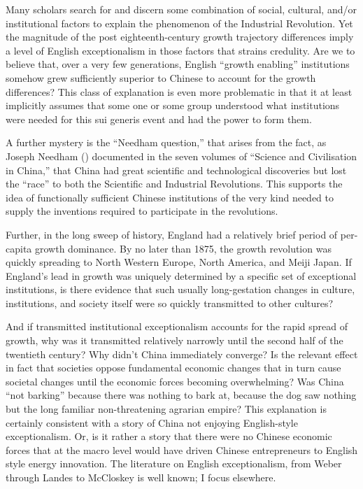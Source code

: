 \documentclass[12pt]{article}
\numberwithin{equation}{section}
\begin{document}
	Many scholars search for and discern some combination of social, cultural, and/or institutional factors to explain the phenomenon of the Industrial Revolution. Yet the magnitude of the post eighteenth-century growth trajectory differences imply a level of English exceptionalism in those factors that strains credulity. Are we to believe that, over a very few generations, English ``growth enabling'' institutions somehow grew sufficiently superior to Chinese to account for the growth differences? This class of explanation is even more problematic in that it at least implicitly assumes that some one or some group understood what institutions were needed for this sui generis event and had the power to form them.
	
	A further mystery is the ``Needham question,'' that arises from the fact, as Joseph Needham (\citeyear{needham_science_1954}) documented in the seven volumes of ``Science and Civilisation in China,'' that China had great scientific and technological discoveries but lost the ``race'' to both the Scientific and Industrial Revolutions. This supports the idea of functionally sufficient Chinese institutions of the very kind needed to supply the inventions required to participate in the revolutions.
	
	Further, in the long sweep of history, England had a relatively brief period of per-capita growth dominance. By no later than 1875, the growth revolution was quickly spreading to North Western Europe, North America, and Meiji Japan. If England's lead in growth was uniquely determined by a specific set of exceptional institutions, is there evidence that such usually long-gestation changes in culture, institutions, and society itself were so quickly transmitted to other cultures?
	
	And if transmitted institutional exceptionalism accounts for the rapid spread of growth, why was it transmitted relatively narrowly until the second half of the twentieth century? Why didn't China immediately converge? Is the relevant effect in fact that societies oppose fundamental economic changes that in turn cause societal changes until the economic forces becoming overwhelming? Was China ``not barking'' because there was nothing to bark at, because the dog saw nothing but the long familiar non-threatening agrarian empire? This explanation is certainly consistent with a story of China not enjoying English-style exceptionalism. Or, is it rather a story that there were no Chinese economic forces that at the macro level would have driven Chinese entrepreneurs to English style energy innovation. The literature on English exceptionalism, from Weber through Landes to McCloskey is well known; I focus elsewhere.
	
\end{document}
